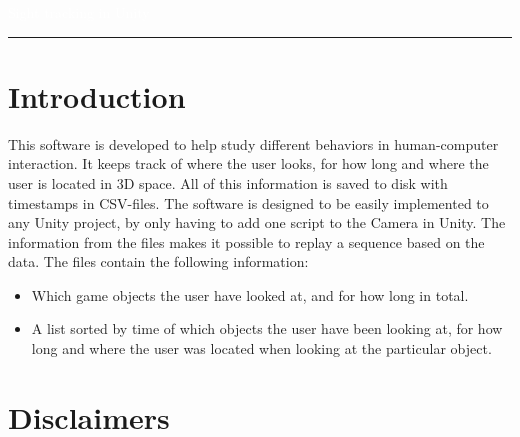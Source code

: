 \documentclass[letterpaper]{article}
\author{%
    Halse, Douglas \\
    Karlsson, Mattias \\
    Larsson, Johan \\
    Persson, Hannes \\
    Östmo, Marcus \\
    }
\makeatletter
\def\printauthor{%
    {\large \@author}}
\makeatother
\begin{document}
\begin{titlepage}
\BgThispage
{}
\vspace*{2cm}
\noindent
\textcolor{white}{\bigsf Sight tracking in Unity}
\vspace*{2.5cm}\par
\noindent
\begin{minipage}{0.35\linewidth}
    \begin{flushright}
        \printauthor
    \end{flushright}
\end{minipage} \hspace{15pt}
%
\begin{minipage}{0.02\linewidth}
    \rule{1pt}{175pt}
\end{minipage} \hspace{-10pt}
%
\begin{minipage}{0.6\linewidth}
\vspace{-2in}
\end{minipage}
\end{titlepage}
\restoregeometry
\tableofcontents
\newpage
\section{Introduction}
This software is developed to help study different behaviors in human-computer interaction. It keeps track of where the user looks, for how long and where the user is located in 3D space. All of this information is saved to disk with timestamps in CSV-files. The software is designed to be easily implemented to any Unity project, by only having to add one script to the Camera in Unity. The information from the files makes it possible to replay a sequence based on the data.
The files contain the following information:\\
\begin{itemize}
\item Which game objects the user have looked at, and for how long in total.\\
\item A list sorted by time of which objects the user have been looking at, for how long and where the user was located when looking at the particular object.
\end{itemize}
\newpage
\section{Disclaimers}
\end{document}
